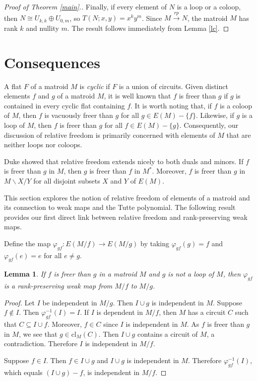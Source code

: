 \documentclass[12pt,reqno]{amsart}
\newtheorem{lemma}[theorem]{Lemma}
\theoremstyle{definition}
\theoremstyle{remark}
\numberwithin{equation}{section}
\newcommand{\del}{\backslash}
\newcommand{\cl}{\text{cl}}
\begin{document}
\begin{proof}[Proof of Theorem \ref{main}.]
    Finally, if every element of $N$ is a loop or a coloop, then $N\cong U_{k,k}\oplus U_{0,m}$, so $T(N;x,y)=x^{k}y^{m}$.
    Since $M\xrightarrow{rp}N$, the matroid $M$ has rank $k$ and nullity $m$. 
    The result follows immediately from Lemma \ref{lc}.  
\end{proof}


\section{Consequences}
A flat $F$ of a matroid $M$ is \textit{cyclic} if $F$ is a union of circuits. Given distinct elements $f$ and $g$ of a matroid $M$, it is well known that $f$ is freer than $g$ if $g$ is contained in every cyclic flat containing $f$. 
It is worth noting that, if $f$ is a coloop of $M$, then $f$ is vacuously freer than $g$ for all $g\in E(M)-\{f\}$. 
Likewise, if $g$ is a loop of $M$, then $f$ is freer than $g$ for all $f\in E(M)-\{g\}$. 
Consequently, our discussion of relative freedom is primarily concerned with elements of $M$ that are neither loops nor coloops. 

Duke showed that relative freedom extends nicely to both duals and minors. If $f$ is freer than $g$ in $M$, then $g$ is freer than $f$ in $M^*$. Moreover, $f$ is freer than $g$ in $M\del X/Y$ for all disjoint subsets $X$ and $Y$ of $E(M)$.  

This section explores the notion of relative freedom of elements of a matroid and its connection to weak maps and the Tutte polynomial. The following result provides our first direct link between relative freedom and rank-preserving weak maps. 


Define the map $\varphi_{gf}: E(M/f) \to E(M/g)$ by taking $\varphi_{gf}(g)=f$ and $\varphi_{gf}(e)=e$ for all $e\neq g$. 

    \begin{lemma}\label{freermap}
       If $f$ is freer than $g$ in a matroid $M$ and $g$ is not a loop of $M$, then $\varphi_{gf}$ is a rank-preserving weak map from $M/f$ to $M/g$.  
   \end{lemma}
        \begin{proof}
            Let $I$ be independent in $M/g$. 
            Then $I\cup g$ is independent in $M$.
            Suppose $f\not\in I$. 
            Then $\varphi_{gf}^{-1}(I)=I$. 
            If $I$ is dependent in $M/f$, then $M$ has a circuit $C$ such that $C\subseteq I\cup f$.
            Moreover, $f\in C$ since $I$ is independent in $M$. 
            As $f$ is freer than $g$ in $M$, we see that $g\in \cl_M(C)$.
            Then $I\cup g$ contains a circuit of $M$, a contradiction.
            Therefore $I$ is independent in $M/f$. 
            
            Suppose $f\in I$. 
            Then $f\in I\cup g$ and $I\cup g$ is independent in $M$. 
            Therefore $\varphi_{gf}^{-1}(I)$, which equals $(I\cup g)-f$, is independent in $M/f$. 
        \end{proof}
\end{document}

